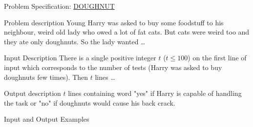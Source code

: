 \documentclass{beamer}
\begin{document}

\begin{frame}{Problem Specification: \href{https://www.spoj.com/problems/DOUGHNUT/}{DOUGHNUT}}
  \begin{block}{Problem description}
    Young Harry was asked to buy some foodstuff to his neighbour, weird old lady who owed a lot of fat cats. But cats were weird too and they ate only doughnuts. So the lady wanted \dots
  \end{block}

  \begin{block}{Input Description}
    There is a single positive integer $t$ ($t \leq 100$) on the first line of input which corresponds to the number of tests (Harry was asked to buy doughnuts few times). Then $t$ lines \dots
  \end{block}

  \begin{block}{Output description}
    $t$ lines containing word "yes" if Harry is capable of handling the task or "no" if doughnuts would cause his back crack.
  \end{block}

  \begin{block}{Input and Output Examples}
  \end{block}

\end{frame}



\end{document}
